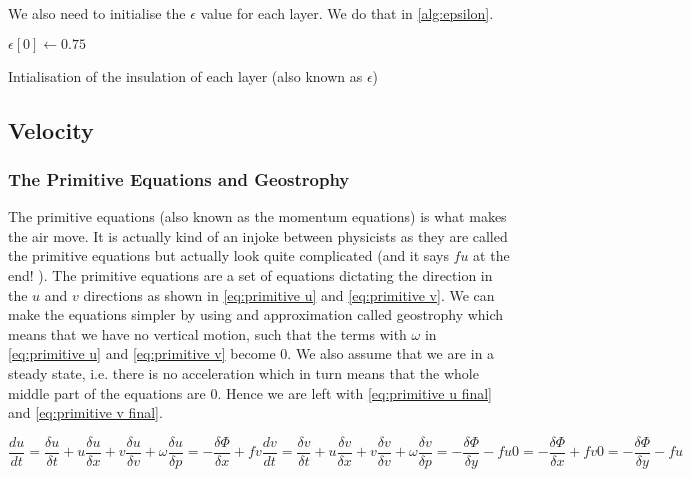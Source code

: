 We also need to initialise the $\epsilon$ value for each layer. We do that in \autoref{alg:epsilon}.

\begin{algorithm}
    $\epsilon[0] \leftarrow 0.75$ \;
    \caption{Intialisation of the insulation of each layer (also known as $\epsilon$)}
    \label{alg:epsilon}
\end{algorithm}

\subsection{Velocity}
\subsubsection{The Primitive Equations and Geostrophy} \label{sec:primitive}
The primitive equations (also known as the momentum equations) is what makes the air move. It is actually kind of an injoke between physicists as they are called the primitive equations but 
actually look quite complicated (and it says $fu$ at the end! \cite{simon}). The primitive equations are a set of equations dictating the direction in the $u$ and $v$ directions as shown in 
\autoref{eq:primitive u} and \autoref{eq:primitive v}. We can make the equations simpler by using and approximation called geostrophy which means that we have no vertical motion, such that the
terms with $\omega$ in \autoref{eq:primitive u} and \autoref{eq:primitive v} become 0. We also assume that we are in a steady state, i.e. there is no acceleration which in turn means that the 
whole middle part of the equations are $0$. Hence we are left with \autoref{eq:primitive u final} and \autoref{eq:primitive v final}.

\begin{subequations}
    \begin{equation}
        \frac{du}{dt} = \frac{\delta u}{\delta t} + u\frac{\delta u}{ \delta x} + v\frac{\delta u}{\delta v} + \omega\frac{\delta u}{\delta p} = -\frac{\delta \Phi}{\delta x} + fv
        \label{eq:primitive u}
    \end{equation}
    \begin{equation}
        \frac{dv}{dt} = \frac{\delta v}{\delta t} + u\frac{\delta v}{ \delta x} + v\frac{\delta v}{\delta v} + \omega\frac{\delta v}{\delta p} = -\frac{\delta \Phi}{\delta y} - fu
        \label{eq:primitive v}
    \end{equation}

    \begin{equation}
        0 = -\frac{\delta \Phi}{\delta x} + fv
        \label{eq:primitive u final}
    \end{equation}
    \begin{equation}
        0 = -\frac{\delta \Phi}{\delta y} - fu
        \label{eq:primitive v final}
    \end{equation}
\end{subequations}

